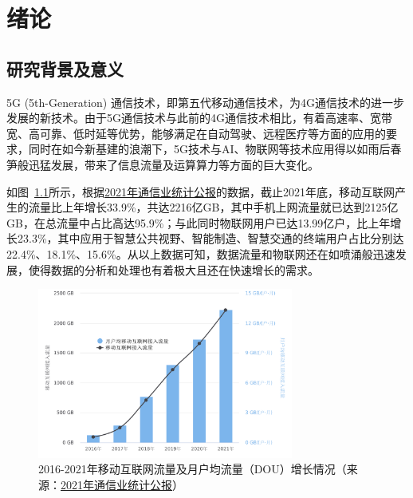 \chapter{绪论}


\section{研究背景及意义}

5G (5th-Generation) 通信技术，即第五代移动通信技术，为4G通信技术的进一步发展的新技术。由于5G通信技术与此前的4G通信技术相比，有着高速率、宽带宽、高可靠、低时延等优势，能够满足在自动驾驶、远程医疗等方面的应用的要求，同时在如今新基建的浪潮下，5G技术与AI、物联网等技术应用得以如雨后春笋般迅猛发展，带来了信息流量及运算算力等方面的巨大变化。

如图~\ref{fig:2016-2021年移动互联网流量及月户均流量（DOU）增长情况}所示，根据\href{https://www.miit.gov.cn/gxsj/tjfx/txy/art/2022/art_e8b64ba8f29d4ce18a1003c4f4d88234.html}{2021年通信业统计公报}的数据，截止2021年底，移动互联网产生的流量比上年增长33.9\%，共达2216亿GB，其中手机上网流量就已达到2125亿GB，在总流量中占比高达95.9\%；与此同时物联网用户已达13.99亿户，比上年增长23.3\%，其中应用于智慧公共视野、智能制造、智慧交通的终端用户占比分别达22.4\%、18.1\%、15.6\%。从以上数据可知，数据流量和物联网还在如喷涌般迅速发展，使得数据的分析和处理也有着极大且还在快速增长的需求。

\begin{figure}[!htbp]
    \centering
    \includegraphics[width=0.75\textwidth]{./images/2016-2021年移动互联网流量及月户均流量（DOU）增长情况.pdf}
    \caption{2016-2021年移动互联网流量及月户均流量（DOU）增长情况（来源：\href{https://www.miit.gov.cn/gxsj/tjfx/txy/art/2022/art_e8b64ba8f29d4ce18a1003c4f4d88234.html}{2021年通信业统计公报}）}
    \label{fig:2016-2021年移动互联网流量及月户均流量（DOU）增长情况}
\end{figure}

